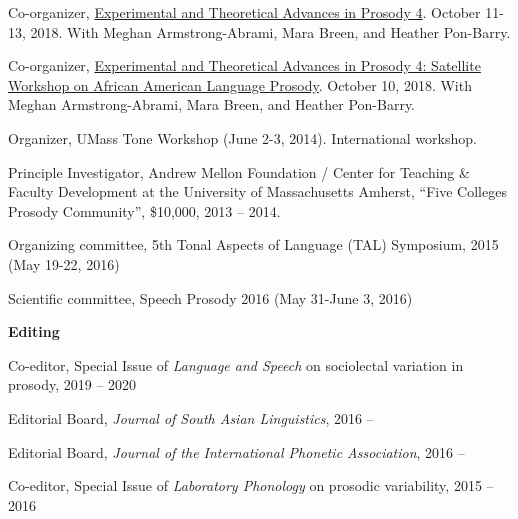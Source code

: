 \documentclass[10pt]{article}
\newcommand{\blankline}{\quad\pagebreak[3]}
\newcommand{\halfblankline}{\quad\vspace{-0.5\baselineskip}\pagebreak[3]}
\begin{document}
    \begin{innerlist}

    \item Co-organizer, \href{https://etap4.krisyu.org}{Experimental and Theoretical Advances in
        Prosody 4}. October 11-13, 2018. With Meghan Armstrong-Abrami, Mara Breen, and Heather Pon-Barry.
      
    \item Co-organizer, \href{https://etap4.krisyu.org/aae}{Experimental and Theoretical Advances in
        Prosody 4: Satellite Workshop on African American Language Prosody}. October 10, 2018. With Meghan Armstrong-Abrami, Mara Breen, and Heather Pon-Barry.
      
        \item Organizer, UMass Tone Workshop (June 2-3,
          2014). International workshop.
        \begin{innerlist}[\enskip$\circ$,leftmargin=*]
            \item Principle Investigator, Andrew Mellon Foundation / Center for Teaching \& Faculty
      Development at the University of Massachusetts Amherst, ``Five
      Colleges Prosody Community'', \$10,000, 2013 -- 2014.
        \end{innerlist}

        \halfblankline

        \item Organizing committee, 5th Tonal Aspects of Language (TAL)
          Symposium, 2015 (May 19-22, 2016)

        \item Scientific committee, Speech Prosody 2016 (May 31-June
          3, 2016)

        \end{innerlist}

\blankline

\textbf{Editing}

\begin{innerlist}

\item Co-editor, Special Issue of \textit{Language and Speech} on sociolectal variation in prosody, 2019 -- 2020
\item Editorial Board, \textit{Journal of South Asian Linguistics},
  2016 --
\item Editorial Board, \textit{Journal of the International Phonetic
    Association}, 2016 --  
\item Co-editor, Special Issue of \textit{Laboratory
    Phonology} on prosodic variability, 2015 -- 2016
\end{innerlist}
\end{document}
